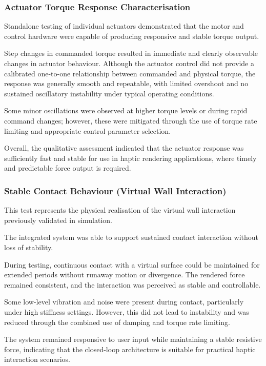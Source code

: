 \subsubsection{Actuator Torque Response Characterisation}

Standalone testing of individual actuators demonstrated that the motor and control hardware were capable of producing responsive and stable torque output.

Step changes in commanded torque resulted in immediate and clearly observable changes in actuator behaviour. Although the actuator control did not provide a calibrated one-to-one relationship between commanded and physical torque, the response was generally smooth and repeatable, with limited overshoot and no sustained oscillatory instability under typical operating conditions.

Some minor oscillations were observed at higher torque levels or during rapid command changes; however, these were mitigated through the use of torque rate limiting and appropriate control parameter selection.

Overall, the qualitative assessment indicated that the actuator response was sufficiently fast and stable for use in haptic rendering applications, where timely and predictable force output is required.

\subsubsection{Stable Contact Behaviour (Virtual Wall Interaction)}

This test represents the physical realisation of the virtual wall interaction previously validated in simulation.

The integrated system was able to support sustained contact interaction without loss of stability.

During testing, continuous contact with a virtual surface could be maintained for extended periods without runaway motion or divergence. The rendered force remained consistent, and the interaction was perceived as stable and controllable.

Some low-level vibration and noise were present during contact, particularly under high stiffness settings. However, this did not lead to instability and was reduced through the combined use of damping and torque rate limiting.

The system remained responsive to user input while maintaining a stable resistive force, indicating that the closed-loop architecture is suitable for practical haptic interaction scenarios.

